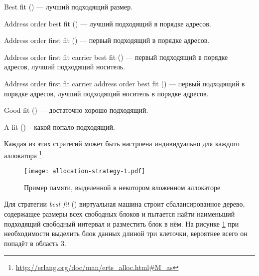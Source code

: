 \documentclass[11pt, oneside]{book}   	%
\newcommand\NamedRef[1]{\ref{#1} <<\nameref{#1}>>}
\begin{document}
\begin{enumerate*}
	\item Best fit () --- лучший подходящий размер.
	\item Address order best fit () --- лучший подходящий в порядке адресов.
	\item Address order first fit () --- первый подходящий в порядке адресов.
	\item Address order first fit carrier best fit () --- первый подходящий в порядке адресов, лучший подходящий носитель.
	\item Address order first fit carrier address order best fit () --- первый подходящий в порядке адресов, лучший подходящий носитель в порядке адресов.
	\item Good fit () --- достаточно хорошо подходящий.
	\item A fit () -- какой попало подходящий.
\end{enumerate*}

Каждая из этих стратегий может быть настроена индивидуально для каждого аллокатора \footnote{\href{http://erlang.org/doc/man/erts\_alloc.html\#M\_as}{http://erlang.org/doc/man/erts\_alloc.html\#M\_as}}.

\begin{figure}
  \texttt{[image: allocation-strategy-1.pdf]}%
  \centering%
	\caption{Пример памяти, выделенной в некотором вложенном аллокаторе}
   \label{fig:allocation-strategy-1}
\end{figure}
\FloatBarrier

Для стратегии \emph{best fit} () виртуальная машина строит сбалансированное дерево, содержащее размеры всех свободных блоков и пытается найти наименьший подходящий свободный интервал и разместить блок в нём. На рисунке \ref{fig:allocation-strategy-1} при необходимости выделить блок данных длиной три клеточки, вероятнее всего он попадёт в область 3.
\end{document}
